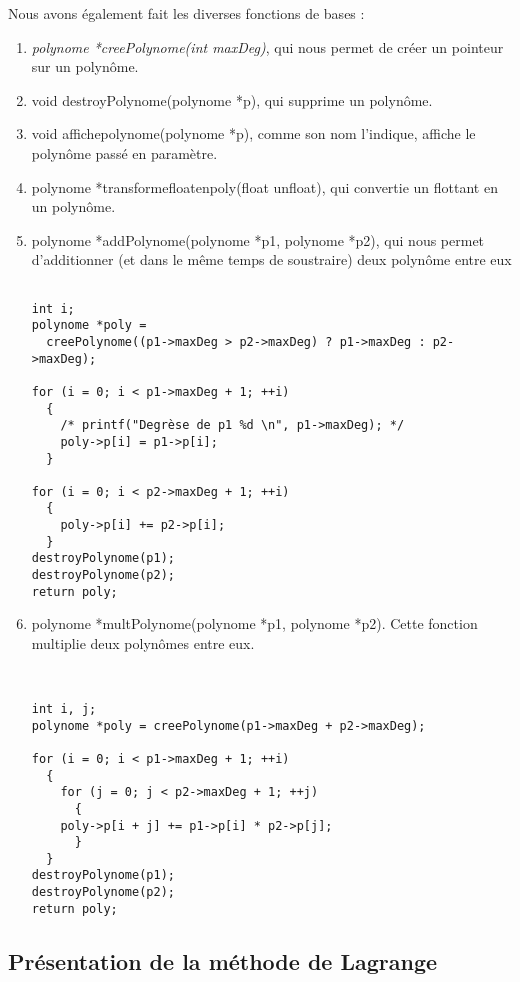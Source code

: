 \documentclass[letter]{article}
\begin{document}
Nous avons également fait les diverses fonctions de bases :
\begin{enumerate}
\item \emph{polynome *creePolynome(int maxDeg)}, qui nous permet de créer un pointeur sur un polynôme.
\item void destroyPolynome(polynome *p), qui supprime un polynôme.
\item void affichepolynome(polynome *p), comme son nom l'indique, affiche le polynôme passé en paramètre.
\item polynome *transformefloatenpoly(float unfloat), qui convertie un flottant en un polynôme.
\item polynome *addPolynome(polynome *p1, polynome *p2), qui nous permet d'additionner (et dans le même temps de soustraire) deux polynôme entre eux

\begin{verbatim}

int i;
polynome *poly =
  creePolynome((p1->maxDeg > p2->maxDeg) ? p1->maxDeg : p2->maxDeg);

for (i = 0; i < p1->maxDeg + 1; ++i)
  {
    /* printf("Degrèse de p1 %d \n", p1->maxDeg); */
    poly->p[i] = p1->p[i];
  }

for (i = 0; i < p2->maxDeg + 1; ++i)
  {
    poly->p[i] += p2->p[i];
  }
destroyPolynome(p1);
destroyPolynome(p2);
return poly;

\end{verbatim}
\item polynome *multPolynome(polynome *p1, polynome *p2). Cette fonction multiplie deux polynômes entre eux.

\begin{verbatim}


int i, j;
polynome *poly = creePolynome(p1->maxDeg + p2->maxDeg);

for (i = 0; i < p1->maxDeg + 1; ++i)
  {
    for (j = 0; j < p2->maxDeg + 1; ++j)
      {
	poly->p[i + j] += p1->p[i] * p2->p[j];
      }
  }
destroyPolynome(p1);
destroyPolynome(p2);
return poly;

\end{verbatim}
\end{enumerate}






\subsection{Présentation de la méthode de Lagrange}
\label{sec:org3abb5ed}
\end{document}
